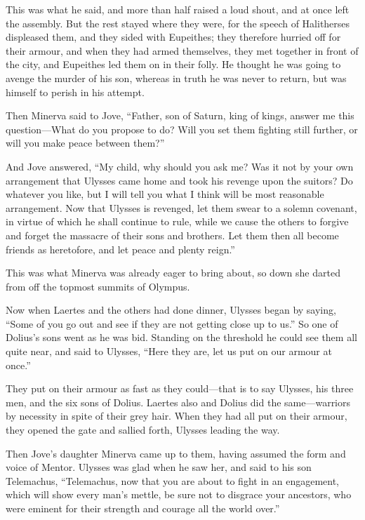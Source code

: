 This was what he said, and more than half raised a loud shout, and at once left
the assembly. But the rest stayed where they were, for the speech of
Halitherses displeased them, and they sided with Eupeithes; they therefore
hurried off for their armour, and when they had armed themselves, they met
together in front of the city, and Eupeithes led them on in their folly. He
thought he was going to avenge the murder of his son, whereas in truth he was
never to return, but was himself to perish in his attempt.

Then Minerva said to Jove, “Father, son of Saturn, king of kings, answer me
this question—What do you propose to do? Will you set them fighting still
further, or will you make peace between them?”

And Jove answered, “My child, why should you ask me? Was it not by your own
arrangement that Ulysses came home and took his revenge upon the suitors? Do
whatever you like, but I will tell you what I think will be most reasonable
arrangement. Now that Ulysses is revenged, let them swear to a solemn covenant,
in virtue of which he shall continue to rule, while we cause the others to
forgive and forget the massacre of their sons and brothers. Let them then all
become friends as heretofore, and let peace and plenty reign.”

This was what Minerva was already eager to bring about, so down she darted from
off the topmost summits of Olympus.

Now when Laertes and the others had done dinner, Ulysses began by saying, “Some
of you go out and see if they are not getting close up to us.” So one of
Dolius’s sons went as he was bid. Standing on the threshold he could see them
all quite near, and said to Ulysses, “Here they are, let us put on our armour
at once.”

They put on their armour as fast as they could—that is to say Ulysses, his
three men, and the six sons of Dolius. Laertes also and Dolius did the
same—warriors by necessity in spite of their grey hair. When they had all put
on their armour, they opened the gate and sallied forth, Ulysses leading the
way.

Then Jove’s daughter Minerva came up to them, having assumed the form and voice
of Mentor. Ulysses was glad when he saw her, and said to his son Telemachus,
“Telemachus, now that you are about to fight in an engagement, which will show
every man’s mettle, be sure not to disgrace your ancestors, who were eminent
for their strength and courage all the world over.”

